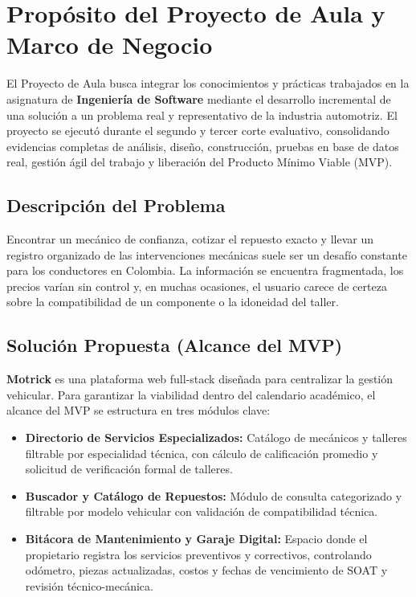 \documentclass[11pt,letterpaper]{article}
\begin{document}
\thispagestyle{plain}
\tableofcontents
\newpage

\section{Propósito del Proyecto de Aula y Marco de Negocio}

El Proyecto de Aula busca integrar los conocimientos y prácticas trabajados en la asignatura de \textbf{Ingeniería de Software} mediante el desarrollo incremental de una solución a un problema real y representativo de la industria automotriz. El proyecto se ejecutó durante el segundo y tercer corte evaluativo, consolidando evidencias completas de análisis, diseño, construcción, pruebas en base de datos real, gestión ágil del trabajo y liberación del Producto Mínimo Viable (MVP).

\subsection{Descripción del Problema}
Encontrar un mecánico de confianza, cotizar el repuesto exacto y llevar un registro organizado de las intervenciones mecánicas suele ser un desafío constante para los conductores en Colombia. La información se encuentra fragmentada, los precios varían sin control y, en muchas ocasiones, el usuario carece de certeza sobre la compatibilidad de un componente o la idoneidad del taller.

\subsection{Solución Propuesta (Alcance del MVP)}
\textbf{Motrick} es una plataforma web full-stack diseñada para centralizar la gestión vehicular. Para garantizar la viabilidad dentro del calendario académico, el alcance del MVP se estructura en tres módulos clave:
\begin{itemize}
    \item \textbf{Directorio de Servicios Especializados:} Catálogo de mecánicos y talleres filtrable por especialidad técnica, con cálculo de calificación promedio y solicitud de verificación formal de talleres.
    \item \textbf{Buscador y Catálogo de Repuestos:} Módulo de consulta categorizado y filtrable por modelo vehicular con validación de compatibilidad técnica.
    \item \textbf{Bitácora de Mantenimiento y Garaje Digital:} Espacio donde el propietario registra los servicios preventivos y correctivos, controlando odómetro, piezas actualizadas, costos y fechas de vencimiento de SOAT y revisión técnico-mecánica.
\end{itemize}
\end{document}
